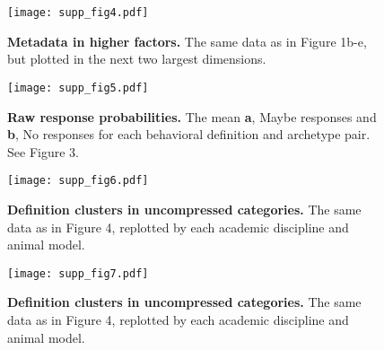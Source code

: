 \documentclass[a4paper, 11pt]{article}
\begin{document}
\begin{figure}
\centerline{\texttt{[image: supp\_fig4.pdf]}}
\caption{\textbf{Metadata in higher factors.} The same data as in Figure 1b-e, but plotted in the next two largest dimensions.}
\end{figure}
\newpage

\begin{figure}
\centerline{\texttt{[image: supp\_fig5.pdf]}}
\caption{\textbf{Raw response probabilities.} The mean \textbf{a}, Maybe responses and \textbf{b}, No responses for each behavioral definition and archetype pair. See Figure 3.}
\end{figure}
\newpage

\begin{figure}
\centerline{\texttt{[image: supp\_fig6.pdf]}}
\caption{\textbf{Definition clusters in uncompressed categories.} The same data as in Figure 4, replotted by each academic discipline and animal model.}
\end{figure}
\newpage

\begin{figure}
\centerline{\texttt{[image: supp\_fig7.pdf]}}
\caption{\textbf{Definition clusters in uncompressed categories.} The same data as in Figure 4, replotted by each academic discipline and animal model.}
\end{figure}
\newpage

{\footnotesize }
% 

\end{document}
